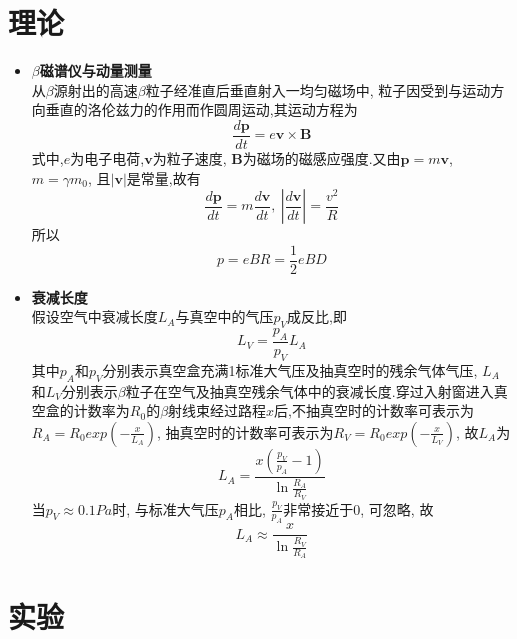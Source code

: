 \documentclass[a4paper]{article}
\begin{document}
\section{理论} \label{theory}%
\begin{itemize}
\item{\textbf{$\beta$磁谱仪与动量测量}\\
从$\beta$源射出的高速$\beta$粒子经准直后垂直射入一均匀磁场中, 粒子因受到与运动方向垂直的洛伦兹力的作用而作圆周运动,其运动方程为
\begin{equation}
\frac{d\mathbf{p}}{dt}=e\mathbf{v}\times\mathbf{B}
\end{equation}
式中,$e$为电子电荷,$\mathbf{v}$为粒子速度, $\mathbf{B}$为磁场的磁感应强度.又由$\mathbf{p}=m\mathbf{v}$, $m=\gamma m_0$, 且$|\mathbf{v}|$是常量,故有
\begin{equation}
\frac{d\mathbf{p}}{dt}=m\frac{d\mathbf{v}}{dt},\ \left|\frac{d\mathbf{v}}{dt}\right|=\frac{v^2}{R}
\end{equation}
所以
\begin{equation}
p=eBR=\frac{1}{2}eBD
\end{equation}
}
\item{\textbf{衰减长度}\\
假设空气中衰减长度$L_A$与真空中的气压$p_V$成反比,即
\begin{equation}
   L_V=\frac{p_A}{p_V}L_A
\end{equation}
其中$p_A$和$p_V$分别表示真空盒充满1标准大气压及抽真空时的残余气体气压, $L_A$和$L_V$分别表示$\beta$粒子在空气及抽真空残余气体中的衰减长度.穿过入射窗进入真空盒的计数率为$R_0$的$\beta$射线束经过路程$x$后,不抽真空时的计数率可表示为$R_A=R_0exp\left(-\frac{x}{L_A}\right)$, 抽真空时的计数率可表示为$R_V=R_0exp\left(-\frac{x}{L_V}\right)$, 故$L_A$为
\begin{equation}
    L_A=\frac{x\left(\frac{p_V}{p_A}-1\right)}{\ln{\frac{R_A}{R_V}}}
\end{equation}
当$p_V\approx0.1Pa$时, 与标准大气压$p_A$相比, $\frac{p_V}{p_A}$非常接近于0, 可忽略, 故
\begin{equation}
    L_A\approx\frac{x}{\ln{\frac{R_V}{R_A}}}
\end{equation}
}

\end{itemize}
\newpage
\section{实验} \label{experiment}%
\end{document}
